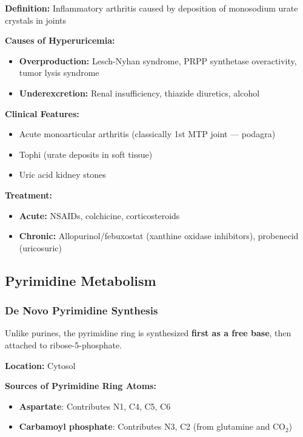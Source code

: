 \begin{tcolorbox}[colback=red!5, colframe=red!70!black, title=\textbf{Clinical Correlation: Gout}]
\textbf{Definition:} Inflammatory arthritis caused by deposition of monosodium urate crystals in joints

\textbf{Causes of Hyperuricemia:}
\begin{itemize}
    \item \textbf{Overproduction:} Lesch-Nyhan syndrome, PRPP synthetase overactivity, tumor lysis syndrome
    \item \textbf{Underexcretion:} Renal insufficiency, thiazide diuretics, alcohol
\end{itemize}

\textbf{Clinical Features:}
\begin{itemize}
    \item Acute monoarticular arthritis (classically 1st MTP joint — podagra)
    \item Tophi (urate deposits in soft tissue)
    \item Uric acid kidney stones
\end{itemize}

\textbf{Treatment:}
\begin{itemize}
    \item \textbf{Acute:} NSAIDs, colchicine, corticosteroids
    \item \textbf{Chronic:} Allopurinol/febuxostat (xanthine oxidase inhibitors), probenecid (uricosuric)
\end{itemize}
\end{tcolorbox}

\subsection{Pyrimidine Metabolism}

\subsubsection{De Novo Pyrimidine Synthesis}

Unlike purines, the pyrimidine ring is synthesized \textbf{first as a free base}, then attached to ribose-5-phosphate.

\textbf{Location:} Cytosol

\textbf{Sources of Pyrimidine Ring Atoms:}
\begin{itemize}
    \item \textbf{Aspartate}: Contributes N1, C4, C5, C6
    \item \textbf{Carbamoyl phosphate}: Contributes N3, C2 (from glutamine and CO$_2$)
\end{itemize}

